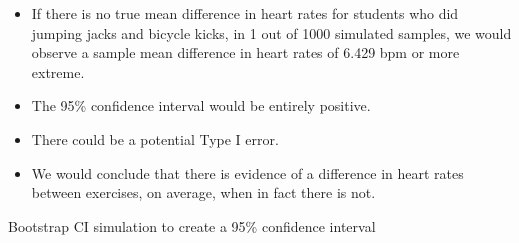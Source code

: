 \documentclass[
]{report}
\newenvironment{Shaded}{\begin{snugshade}}{\end{snugshade}}
\newcommand{\AttributeTok}[1]{\textcolor[rgb]{0.13,0.29,0.53}{#1}}
\newcommand{\CommentTok}[1]{\textcolor[rgb]{0.56,0.35,0.01}{\textit{#1}}}
\newcommand{\DecValTok}[1]{\textcolor[rgb]{0.00,0.00,0.81}{#1}}
\newcommand{\FloatTok}[1]{\textcolor[rgb]{0.00,0.00,0.81}{#1}}
\newcommand{\FunctionTok}[1]{\textcolor[rgb]{0.13,0.29,0.53}{\textbf{#1}}}
\newcommand{\NormalTok}[1]{#1}
\newcommand{\SpecialCharTok}[1]{\textcolor[rgb]{0.81,0.36,0.00}{\textbf{#1}}}
\providecommand{\tightlist}{%
  \setlength{\itemsep}{0pt}\setlength{\parskip}{0pt}}
\begin{document}
\vspace{0.5in}

\begin{itemize}
\tightlist
\item
  If there is no true mean difference in heart rates for students who did jumping jacks and bicycle kicks, in 1 out of 1000 simulated samples, we would observe a sample mean difference in heart rates of 6.429 bpm or more extreme.
\end{itemize}

\vspace{0.5in}

\begin{itemize}
\tightlist
\item
  The 95\% confidence interval would be entirely positive.
\end{itemize}

\vspace{0.5in}

\begin{itemize}
\tightlist
\item
  There could be a potential Type I error.
\end{itemize}

\vspace{0.5in}

\begin{itemize}
\tightlist
\item
  We would conclude that there is evidence of a difference in heart rates between exercises, on average, when in fact there is not.
\end{itemize}

\vspace{0.5in}

Bootstrap CI simulation to create a 95\% confidence interval

\begin{Shaded}
\end{Shaded}
\end{document}
